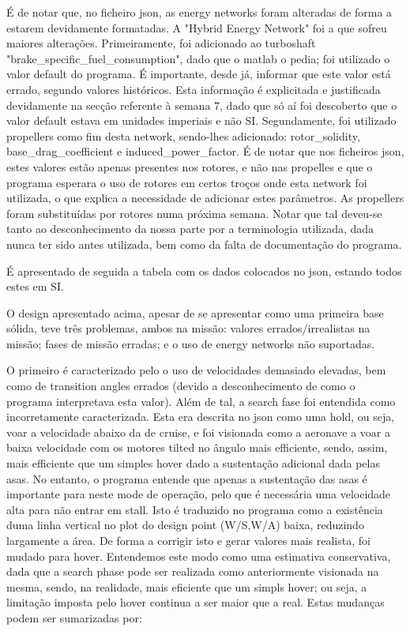 É de notar que, no ficheiro json, as energy networks foram alteradas de forma a estarem devidamente formatadas. A "Hybrid Energy Network" foi a que sofreu maiores alterações. Primeiramente, foi adicionado ao turboshaft "brake\_specific\_fuel\_consumption", dado que o matlab o pedia; foi utilizado o valor default do programa. É importante, desde já, informar que este valor está errado, segundo valores históricos. Esta informação é explicitada e justificada devidamente na secção referente à semana 7, dado que só aí foi descoberto que o valor default estava em unidades imperiais e não SI. Segundamente, foi utilizado propellers como fim desta network, sendo-lhes adicionado: rotor\_solidity, base\_drag\_coefficient e induced\_power\_factor. É de notar que nos ficheiros json, estes valores estão apenas presentes nos rotores, e não nas propelles e que o programa esperara o uso de rotores em certos troços onde esta network foi utilizada, o que explica a necessidade de adicionar estes parâmetros. As propellers foram substituídas por rotores numa próxima semana. Notar que tal deveu-se tanto ao desconhecimento da nossa parte por a terminologia utilizada, dada nunca ter sido antes utilizada, bem como da falta de documentação do programa.\par
É apresentado de seguida a tabela com os dados colocados no json, estando todos estes em SI.\par

\par
O design apresentado acima, apesar de se apresentar como uma primeira base sólida, teve três problemas, ambos na missão: valores errados/irrealistas na missão; fases de missão erradas; e o uso de energy networks não suportadas.\par
O primeiro é caracterizado pelo o uso de velocidades demasiado elevadas, bem como de transition angles errados (devido a desconhecimento de como o programa interpretava esta valor). Além de tal, a search fase foi entendida como incorretamente caracterizada. Esta era descrita no json como uma hold, ou seja, voar a velocidade abaixo da de cruise, e foi visionada como a aeronave a voar a baixa velocidade com os motores tilted no ângulo mais efficiente, sendo, assim, mais efficiente que um simples hover dado a sustentação adicional dada pelas asas. No entanto, o programa entende que apenas a sustentação das asas é importante para neste mode de operação, pelo que é necessária uma velocidade alta para não entrar em stall. Isto é traduzido no programa como a existência duma linha vertical no plot do design point (W/S,W/A) baixa, reduzindo largamente a área. De forma a corrigir isto e gerar valores mais realista, foi mudado para hover. Entendemos este modo como uma estimativa conservativa, dada que a search phase pode ser realizada como anteriormente visionada na mesma, sendo, na realidade, mais eficiente que um simpls hover; ou seja, a limitação imposta pelo hover continua a ser maior que a real. Estas mudanças podem ser sumarizadas por:\par

